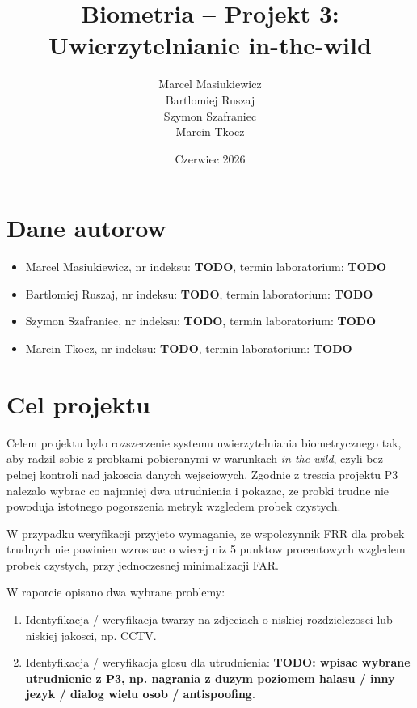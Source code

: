 \documentclass[12pt]{article}
\title{Biometria -- Projekt 3: Uwierzytelnianie in-the-wild}
\author{
Marcel Masiukiewicz \\
Bartlomiej Ruszaj \\
Szymon Szafraniec \\
Marcin Tkocz
}
\date{Czerwiec 2026}
\begin{document}
\maketitle

\section{Dane autorow}

\begin{itemize}
    \item Marcel Masiukiewicz, nr indeksu: \textbf{TODO}, termin laboratorium: \textbf{TODO}
    \item Bartlomiej Ruszaj, nr indeksu: \textbf{TODO}, termin laboratorium: \textbf{TODO}
    \item Szymon Szafraniec, nr indeksu: \textbf{TODO}, termin laboratorium: \textbf{TODO}
    \item Marcin Tkocz, nr indeksu: \textbf{TODO}, termin laboratorium: \textbf{TODO}
\end{itemize}

\section{Cel projektu}

Celem projektu bylo rozszerzenie systemu uwierzytelniania biometrycznego tak, aby radzil sobie z probkami pobieranymi w warunkach \textit{in-the-wild}, czyli bez pelnej kontroli nad jakoscia danych wejsciowych. Zgodnie z trescia projektu P3 nalezalo wybrac co najmniej dwa utrudnienia i pokazac, ze probki trudne nie powoduja istotnego pogorszenia metryk wzgledem probek czystych.

W przypadku weryfikacji przyjeto wymaganie, ze wspolczynnik FRR dla probek trudnych nie powinien wzrosnac o wiecej niz 5 punktow procentowych wzgledem probek czystych, przy jednoczesnej minimalizacji FAR.

W raporcie opisano dwa wybrane problemy:

\begin{enumerate}
    \item Identyfikacja / weryfikacja twarzy na zdjeciach o niskiej rozdzielczosci lub niskiej jakosci, np. CCTV.
    \item Identyfikacja / weryfikacja glosu dla utrudnienia: \textbf{TODO: wpisac wybrane utrudnienie z P3, np. nagrania z duzym poziomem halasu / inny jezyk / dialog wielu osob / antispoofing}.
\end{enumerate}
\end{document}
